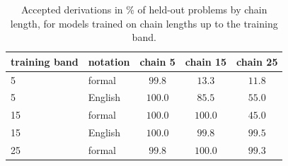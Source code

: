 \begin{table}[H]
\caption{Accepted derivations in \% of held-out problems by chain length, for models trained on chain lengths up to the training band.}
\label{tab:depth}
\begin{center}
\small
\begin{tabular}{llccc}
\toprule
training band & notation & chain 5 & chain 15 & chain 25 \\
\midrule
5  & formal  & $99.8$ & $13.3$ & $11.8$ \\
5  & English & $100.0$ & $85.5$ & $55.0$ \\
15 & formal  & $100.0$ & $100.0$ & $45.0$ \\
15 & English & $100.0$ & $99.8$ & $\mathbf{99.5}$ \\
25 & formal  & $99.8$ & $100.0$ & $99.3$ \\
\bottomrule
\end{tabular}
\end{center}
\end{table}
